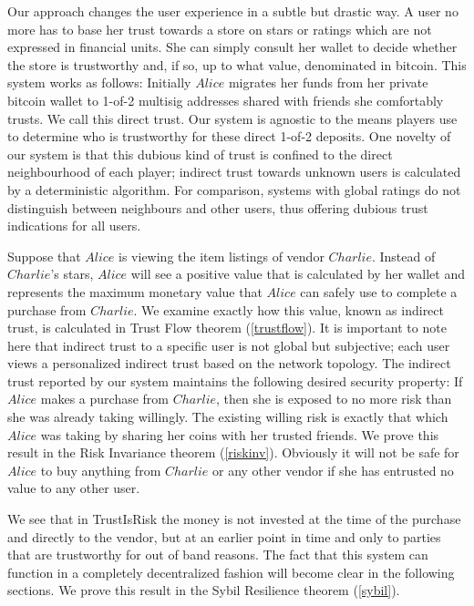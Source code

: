   Our approach changes the user experience in a subtle but drastic way. A user no more has to base her trust towards a
  store on stars or ratings which are not expressed in financial units. She can simply consult her wallet to decide whether
  the store is trustworthy and, if so, up to what value, denominated in bitcoin. This system works as follows: Initially
  $Alice$ migrates her funds from her private bitcoin wallet to 1-of-2 multisig addresses shared with friends she
  comfortably trusts. We call this direct trust. Our system is agnostic to the means players use to determine who is
  trustworthy for these direct 1-of-2 deposits. One novelty of our system is that this dubious kind of trust is confined to
  the direct neighbourhood of each player; indirect trust towards unknown users is calculated by a deterministic algorithm.
  For comparison, systems with global ratings do not distinguish between neighbours and other users, thus offering dubious
  trust indications for all users.

  Suppose that $Alice$ is viewing the item listings of vendor $Charlie$. Instead of $Charlie$'s stars, $Alice$ will see a
  positive value that is calculated by her wallet and represents the maximum monetary value that $Alice$ can safely use to
  complete a purchase from $Charlie$. We examine exactly how this value, known as indirect trust, is calculated in Trust
  Flow theorem (\ref{trustflow}). It is important to note here that indirect trust to a specific user is not global but
  subjective; each user views a personalized indirect trust based on the network topology. The indirect trust reported by
  our system maintains the following desired security property: If $Alice$ makes a purchase from $Charlie$, then she is
  exposed to no more risk than she was already taking willingly. The existing willing risk is exactly that which $Alice$
  was taking by sharing her coins with her trusted friends. We prove this result in the Risk Invariance theorem
  (\ref{riskinv}). Obviously it will not be safe for $Alice$ to buy anything from $Charlie$ or any other vendor if she has
  entrusted no value to any other user.

  We see that in TrustIsRisk the money is not invested at the time of the purchase and directly to the vendor, but at an
  earlier point in time and only to parties that are trustworthy for out of band reasons. The fact that this system can
  function in a completely decentralized fashion will become clear in the following sections. We prove this result in the
  Sybil Resilience theorem (\ref{sybil}).

